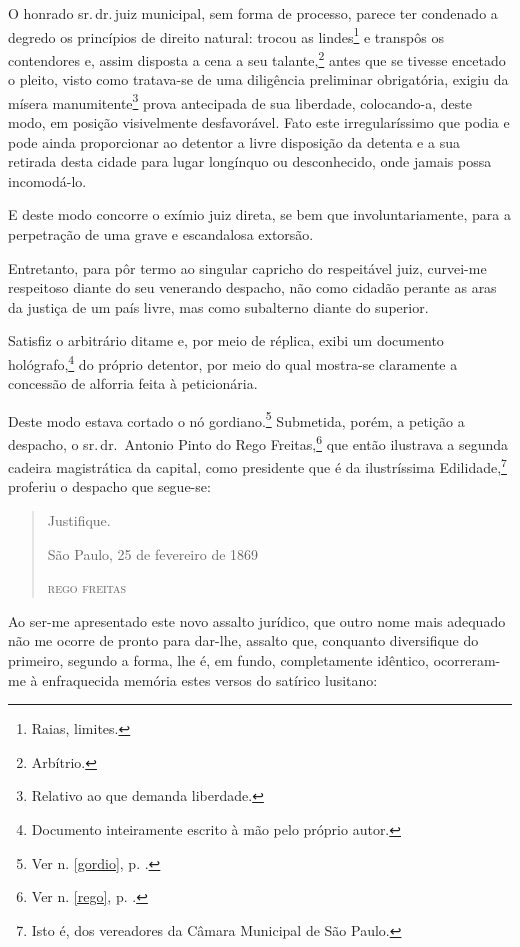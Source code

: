O honrado sr.\,dr.\,juiz municipal, sem forma de processo, parece ter
condenado a degredo os princípios de direito natural: trocou as
lindes\footnote{Raias, limites.} e transpôs os contendores e, assim
disposta a cena a seu talante,\footnote{Arbítrio.} antes que se
tivesse encetado o pleito, visto como tratava-se de uma diligência
preliminar obrigatória, exigiu da mísera manumitente\footnote{Relativo
  ao que demanda liberdade.} prova antecipada de sua liberdade,
colocando-a, deste modo, em posição visivelmente desfavorável. Fato este
irregularíssimo que podia e pode ainda proporcionar ao detentor a livre
disposição da detenta e a sua retirada desta cidade para lugar longínquo
ou desconhecido, onde jamais possa incomodá-lo.

E deste modo concorre o exímio juiz direta, se bem que
involuntariamente, para a perpetração de uma grave e escandalosa
extorsão.

Entretanto, para pôr termo ao singular capricho do respeitável juiz,
curvei-me respeitoso diante do seu venerando despacho, não como cidadão
perante as aras da justiça de um país livre, mas como subalterno diante
do superior.

Satisfiz o arbitrário ditame e, por meio de réplica, exibi um documento
hológrafo,\footnote{Documento inteiramente escrito à mão pelo próprio
  autor.} do próprio detentor, por meio do qual mostra-se claramente a
concessão de alforria feita à peticionária.

Deste modo estava cortado o nó gordiano.\footnote{Ver n. \ref{gordio}, p. 
\pageref{gordio}.} Submetida, porém, a petição a despacho, o sr.\,dr.~Antonio 
Pinto do Rego Freitas,\footnote{Ver n. \ref{rego}, p. \pageref{rego}.} 
que então ilustrava a segunda cadeira magistrática da capital, como presidente 
que é da ilustríssima Edilidade,\footnote{Isto é, dos vereadores da 
Câmara Municipal de São Paulo.} proferiu o despacho que segue-se:

\begin{quote}
Justifique.

\quad{}São Paulo, 25 de fevereiro de 1869

\quad\textsc{rego freitas}
\end{quote}

Ao ser-me apresentado este novo assalto jurídico, que outro nome mais
adequado não me ocorre de pronto para dar-lhe, assalto que, conquanto
diversifique do primeiro, segundo a forma, lhe é, em fundo,
completamente idêntico, ocorreram-me à enfraquecida memória estes versos
do satírico lusitano:

